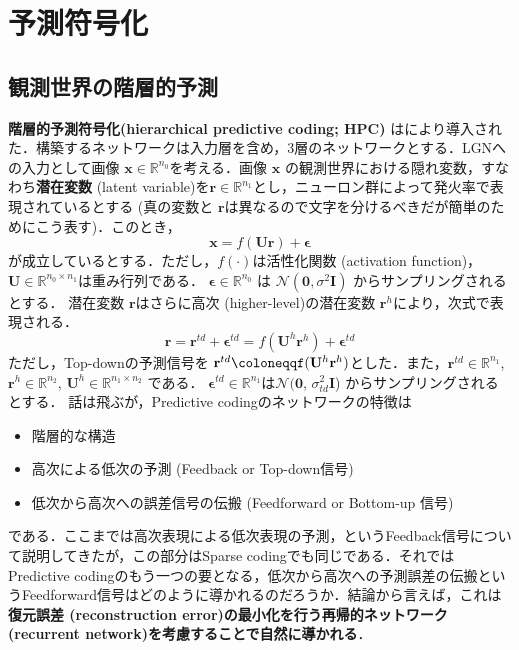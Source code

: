 \section{予測符号化}
\subsection{観測世界の階層的予測}
\textbf{階層的予測符号化(hierarchical predictive coding; HPC)} は\citep{Rao1999-zv}により導入された．構築するネットワークは入力層を含め，3層のネットワークとする．LGNへの入力として画像 $\mathbf{x} \in \mathbb{R}^{n_0}$を考える．画像 $\mathbf{x}$ の観測世界における隠れ変数，すなわち\textbf{潜在変数} (latent variable)を$\mathbf{r} \in \mathbb{R}^{n_1}$とし，ニューロン群によって発火率で表現されているとする (真の変数と $\mathbf{r}$は異なるので文字を分けるべきだが簡単のためにこう表す)．このとき，
\begin{equation}
\mathbf{x} = f(\mathbf{U}\mathbf{r}) + \boldsymbol{\epsilon}
\end{equation}
が成立しているとする．ただし，$f(\cdot)$は活性化関数 (activation function)，$\mathbf{U} \in \mathbb{R}^{n_0 \times n_1}$は重み行列である．
$\boldsymbol{\epsilon} \in \mathbb{R}^{n_0}$ は $\mathcal{N}(\mathbf{0}, \sigma^2 \mathbf{I})$ からサンプリングされるとする．
潜在変数 $\mathbf{r}$はさらに高次 (higher-level)の潜在変数 $\mathbf{r}^h$により，次式で表現される．
\begin{equation}
\mathbf{r} = \mathbf{r}^{td}+\boldsymbol{\epsilon}^{td}=f(\mathbf{U}^h \mathbf{r}^h)+\boldsymbol{\epsilon}^{td}
\end{equation}
ただし，Top-downの予測信号を $\mathbf{r}^{td}\coloneqqf(\mathbf{U}^h \mathbf{r}^h)$とした．また，$\mathbf{r}^{td} \in \mathbb{R}^{n_1}$, $\mathbf{r}^{h} \in \mathbb{R}^{n_2}$, $\mathbf{U}^h \in \mathbb{R}^{n_1 \times n_2}$ である．
$\boldsymbol{\epsilon}^{td} \in \mathbb{R}^{n_1}$は$\mathcal{N}(\mathbf{0}$, $\sigma_{td}^2 \mathbf{I}$) からサンプリングされるとする．
話は飛ぶが，Predictive codingのネットワークの特徴は
\begin{itemize}
\item 階層的な構造
\item 高次による低次の予測 (Feedback or Top-down信号)
\item 低次から高次への誤差信号の伝搬 (Feedforward or Bottom-up 信号)
\end{itemize}
である．ここまでは高次表現による低次表現の予測，というFeedback信号について説明してきたが，この部分はSparse codingでも同じである．それではPredictive codingのもう一つの要となる，低次から高次への予測誤差の伝搬というFeedforward信号はどのように導かれるのだろうか．結論から言えば，これは\textbf{復元誤差 (reconstruction error)の最小化を行う再帰的ネットワーク (recurrent network)を考慮することで自然に導かれる}．
